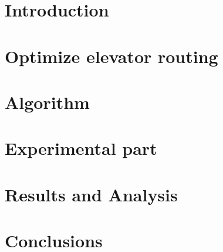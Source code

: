 \documentclass{scrartcl}
\title{\reportname}
\subtitle{An Evolutionary Algorithm for an elevator to deliver as many people as possible to their desired floor}
\author{Oskar Sundberg \and Linus Savinainen \and Samuel Wallander Leyonberg \and Gustav Pråmell \and Joel Scarinius Stävmo}
\date{\today}
\begin{document}
\maketitle

\newpage

\tableofcontents

\newpage

\section{Introduction}
\label{sec:intro}


\section{Optimize elevator routing}
\label{sec:problem_description}


\section{Algorithm}
\label{sec:algorithm}


\section{Experimental part}
\label{sec:experimentation}


\section{Results and Analysis}
\label{sec:results-analysis}


\section{Conclusions}
\label{sec:conclusions}




\end{document}
